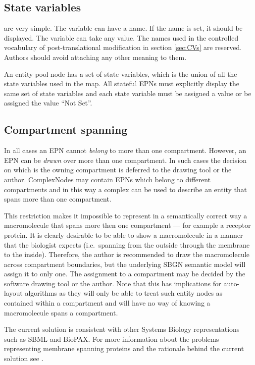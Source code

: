 \subsection{State variables}

 are very simple. The variable can have a name. If the
name is set, it should be displayed. The variable can take any
value. The names used in the controlled vocabulary of
post-translational modification in section \ref{sec:CVs} are
reserved. Authors should avoid attaching any other meaning to them.

An entity pool node has a set of state variables, which is the union
of all the state variables used in the map. 
All stateful EPNs must explicitly display the same set of
state variables and each state variable must be assigned a value or be
assigned the value ``Not Set''.

\subsection{Compartment spanning}

In all cases an EPN cannot \emph{belong} to more than one
compartment. However, an EPN can be \emph{drawn} over more than one
compartment. In such cases the decision on which is the owning
compartment is deferred to the drawing tool or the
author. ComplexNodes may contain EPNs which belong to different
compartments and in this way a complex can be used to describe an
entity that spans more than one compartment.

This restriction makes it impossible to represent in a semantically
correct way a macromolecule that spans more then one compartment ---
for example a receptor protein. It is clearly desirable to be able to
show a macromolecule in a manner that the biologist expects (i.e.\,
spanning from the outside through the membrane to the
inside). Therefore, the author is recommended to draw the
macromolecule across compartment boundaries, but the underlying SBGN
semantic model will assign it to only one. The assignment to a
compartment may be decided by the software drawing tool or the
author. Note that this has implications for auto-layout algorithms as
they will only be able to treat such entity nodes as contained within
a compartment and will have no way of knowing a macromolecule spans a
compartment.

The current solution is consistent with other Systems Biology
representations such as SBML and BioPAX. For more information about the
problems representing membrane spanning proteins and the rationale
behind the current solution see .

